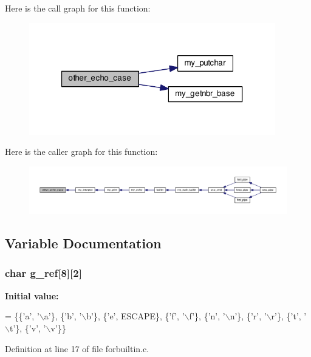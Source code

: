 Here is the call graph for this function\-:\nopagebreak
\begin{figure}[H]
\begin{center}
\leavevmode
\includegraphics[width=304pt]{forbuiltin_8c_af3d3a3e1f2acbf9eccc05028b283bbb6_cgraph}
\end{center}
\end{figure}




Here is the caller graph for this function\-:
\nopagebreak
\begin{figure}[H]
\begin{center}
\leavevmode
\includegraphics[width=350pt]{forbuiltin_8c_af3d3a3e1f2acbf9eccc05028b283bbb6_icgraph}
\end{center}
\end{figure}




\subsection{Variable Documentation}
\subsubsection[{g\-\_\-ref}]{\setlength{\rightskip}{0pt plus 5cm}char g\-\_\-ref[8][2]}\label{forbuiltin_8c_a8ca280e502460ed6510ec75af0321d03}
{\bfseries Initial value\-:}
\begin{DoxyCode}
= \{\{\textcolor{charliteral}{'a'}, \textcolor{charliteral}{'\(\backslash\)a'}\},
               \{\textcolor{charliteral}{'b'}, \textcolor{charliteral}{'\(\backslash\)b'}\},
               \{\textcolor{charliteral}{'e'}, ESCAPE\},
               \{\textcolor{charliteral}{'f'}, \textcolor{charliteral}{'\(\backslash\)f'}\},
               \{\textcolor{charliteral}{'n'}, \textcolor{charliteral}{'\(\backslash\)n'}\},
               \{\textcolor{charliteral}{'r'}, \textcolor{charliteral}{'\(\backslash\)r'}\},
               \{\textcolor{charliteral}{'t'}, \textcolor{charliteral}{'\(\backslash\)t'}\},
               \{\textcolor{charliteral}{'v'}, \textcolor{charliteral}{'\(\backslash\)v'}\}\}
\end{DoxyCode}


Definition at line 17 of file forbuiltin.\-c.


